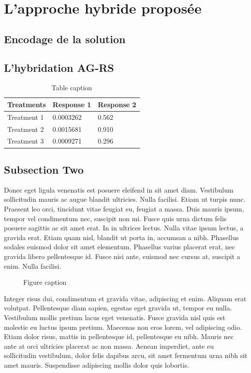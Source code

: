 \documentclass[preprint,12pt]{elsarticle}
\begin{document}
\section{L'approche hybride proposée}

\subsection{Encodage de la solution}
\subsection{L'hybridation AG-RS}
\medskip




\begin{table}[h]
\centering
\begin{tabular}{l l l}
\hline
\textbf{Treatments} & \textbf{Response 1} & \textbf{Response 2}\\
\hline
Treatment 1 & 0.0003262 & 0.562 \\
Treatment 2 & 0.0015681 & 0.910 \\
Treatment 3 & 0.0009271 & 0.296 \\
\hline
\end{tabular}
\caption{Table caption}
\end{table}




\subsection{Subsection Two}

Donec eget ligula venenatis est posuere eleifend in sit amet diam. Vestibulum sollicitudin mauris ac augue blandit ultricies. Nulla facilisi. Etiam ut turpis nunc. Praesent leo orci, tincidunt vitae feugiat eu, feugiat a massa. Duis mauris ipsum, tempor vel condimentum nec, suscipit non mi. Fusce quis urna dictum felis posuere sagittis ac sit amet erat. In in ultrices lectus. Nulla vitae ipsum lectus, a gravida erat. Etiam quam nisl, blandit ut porta in, accumsan a nibh. Phasellus sodales euismod dolor sit amet elementum. Phasellus varius placerat erat, nec gravida libero pellentesque id. Fusce nisi ante, euismod nec cursus at, suscipit a enim. Nulla facilisi.

\begin{figure}[h]

\caption{Figure caption}
\end{figure}

Integer risus dui, condimentum et gravida vitae, adipiscing et enim. Aliquam erat volutpat. Pellentesque diam sapien, egestas eget gravida ut, tempor eu nulla. Vestibulum mollis pretium lacus eget venenatis. Fusce gravida nisl quis est molestie eu luctus ipsum pretium. Maecenas non eros lorem, vel adipiscing odio. Etiam dolor risus, mattis in pellentesque id, pellentesque eu nibh. Mauris nec ante at orci ultricies placerat ac non massa. Aenean imperdiet, ante eu sollicitudin vestibulum, dolor felis dapibus arcu, sit amet fermentum urna nibh sit amet mauris. Suspendisse adipiscing mollis dolor quis lobortis.
\end{document}
